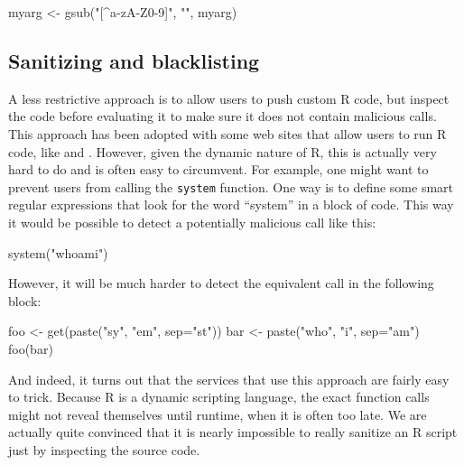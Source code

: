 \documentclass[article]{jss}
\newcommand{\R}{\textsf{R}\xspace}
\begin{document}
\begin{CodeChunk}
\begin{CodeInput}
myarg <- gsub("[^a-zA-Z0-9]", "", myarg)
\end{CodeInput}
\end{CodeChunk}


\subsection{Sanitizing and blacklisting}

A less restrictive approach is to allow users to push custom \R code, but
inspect the code before evaluating it to make sure it does not contain malicious calls.
This approach has been adopted with some web sites that allow users to run
\R code, like \cite{banfield1999rweb} and \cite{cloudstat}. However,
given the dynamic nature of \R, this is actually very hard to do and
is often easy to circumvent. For example, one might want to prevent users from
calling the \texttt{system} function. One way is to define some smart regular
expressions that look for the word ``system'' in a block of code. This way
it would be possible to detect a potentially malicious call like this:

\begin{CodeChunk}
\begin{CodeInput}
system("whoami")
\end{CodeInput}
\end{CodeChunk}

However, it will be much harder to detect the equivalent call in the following
block:

\begin{CodeChunk}
\begin{CodeInput}
foo <- get(paste("sy", "em", sep="st"))
bar <- paste("who", "i", sep="am")
foo(bar)
\end{CodeInput}
\end{CodeChunk}

And indeed, it turns out that the services that use this approach are fairly
easy to trick. Because \R is a dynamic scripting language, the exact
function calls might not reveal themselves until runtime, when it is often too
late. We are actually quite convinced that it is nearly impossible to really
sanitize an \R script just by inspecting the source code.
\end{document}
